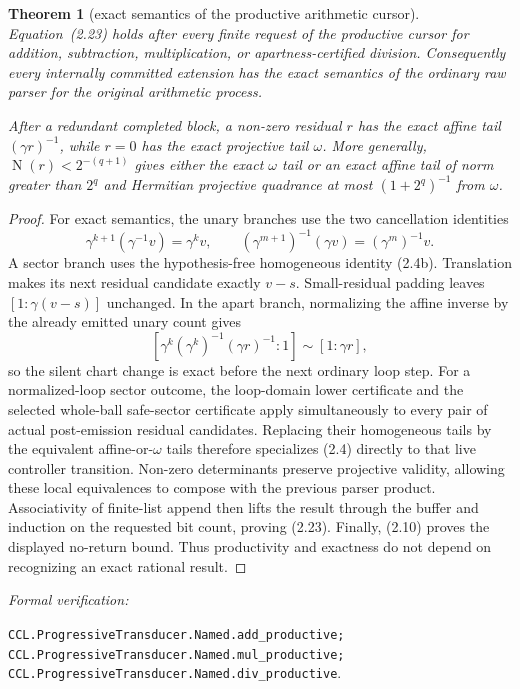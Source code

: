 \documentclass[10pt]{article}
\newtheorem{theorem}{Theorem}[section]
\theoremstyle{definition}
\theoremstyle{remark}
\newcommand{\Norm}{\operatorname{N}}
\newcommand{\leanref}[1]{\par\smallskip\noindent
  \emph{Formal verification:}\par\nobreak
  {\raggedright\nolinkurl{#1}.\par}}
\newcommand{\Proj}[2]{[#1:#2]}
\begin{document}
\begin{theorem}[exact semantics of the productive arithmetic cursor]
\label{thm:ccl-arithmetic-productive}
Equation~(2.23) holds after every finite request of the productive cursor for
addition, subtraction, multiplication, or apartness-certified division.
Consequently every internally committed extension has the exact semantics of
the ordinary raw parser for the original arithmetic process.

After a redundant completed block, a non-zero residual $r$ has the exact
affine tail $(\gamma r)^{-1}$, while $r=0$ has the exact projective tail
$\omega$.  More generally, $\Norm(r)<2^{-(q+1)}$ gives either the exact
$\omega$ tail or an exact affine tail of norm greater than $2^q$ and
Hermitian projective quadrance at most $(1+2^q)^{-1}$ from $\omega$.
\end{theorem}

\begin{proof}
For exact semantics, the unary branches use the two cancellation identities
\[
 \gamma^{k+1}(\gamma^{-1}v)=\gamma^kv,
 \qquad
 (\gamma^{m+1})^{-1}(\gamma v)=(\gamma^m)^{-1}v.
\]
A sector branch uses the hypothesis-free homogeneous identity (2.4b).
Translation makes its next residual candidate exactly $v-s$.  Small-residual
padding leaves $\Proj{1}{\gamma(v-s)}$ unchanged.  In the apart branch,
normalizing the affine inverse by the already emitted unary count gives
\[
 \Proj{\gamma^k(\gamma^k)^{-1}(\gamma r)^{-1}}{1}
 \sim\Proj{1}{\gamma r},
\]
so the silent chart change is exact before the next ordinary loop step.
For a normalized-loop sector outcome, the loop-domain lower certificate and
the selected whole-ball safe-sector certificate apply simultaneously to
every pair of actual post-emission residual candidates.  Replacing their
homogeneous tails by the equivalent affine-or-$\omega$ tails therefore
specializes (2.4) directly to that live controller transition.
Non-zero determinants preserve projective validity, allowing these local
equivalences to compose with the previous parser product.  Associativity of
finite-list append then lifts the result through the buffer and induction on
the requested bit count, proving (2.23).  Finally, (2.10) proves the displayed
no-return bound.  Thus productivity and exactness do not depend on recognizing
an exact rational result.
\end{proof}

\leanref{CCL.ProgressiveTransducer.Named.add_productive;
CCL.ProgressiveTransducer.Named.mul_productive;
CCL.ProgressiveTransducer.Named.div_productive}
\end{document}
